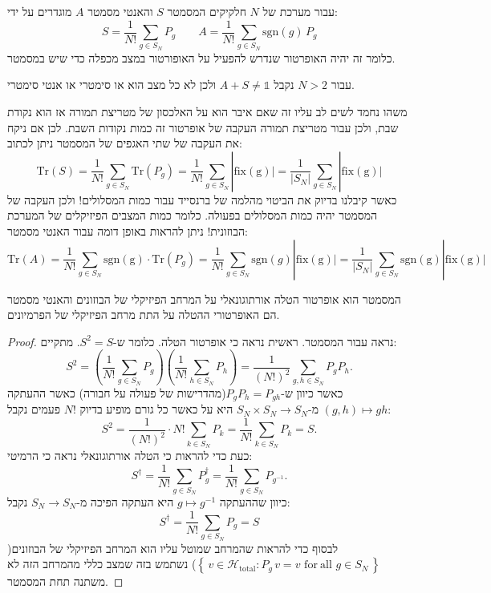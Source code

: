 \documentclass{tstextbook}
\begin{document}
\begin{definition}
עבור מערכת של \(N\) חלקיקים המסמטר \(S\) והאנטי מסמטר \(A\) מוגדרים על ידי:
$$S={\frac{1}{N!}}\sum_{g\in S_{N}}P_{g}\qquad A=\frac{1}{N!}\sum_{g\in S_{N}}\mathrm{sgn}(g)\,P_{g}$$
כלומר זה יהיה האופרטור שנדרש להפעיל על האופורטור במצב מכפלה כדי שיש במסמטר. 

\end{definition}
\begin{remark}
עבור \(N>2\) נקבל \(A+S\neq \mathbb{1}\) ולכן לא כל מצב הוא או סימטרי או אנטי סימטרי.

\end{remark}
\begin{remark}
משהו נחמד לשים לב עליו זה שאם איבר הוא על האלכסון של מטריצת תמורה אז הוא נקודת שבת, ולכן עבור מטריצת תמורה העקבה של אופרטור זה כמות נקודות השבת. לכן אם ניקח את העקבה של שתי האגפים של המסמטר ניתן לכתוב:
$$\mathrm{Tr}(S)=\frac{1}{N!}\sum_{g\in S_{N}}\mathrm{Tr}(P_{g})=\frac{1}{N!}\sum_{g \in S_{N}}|\mathrm{fix(g)|}=\frac{1}{|S_{N}|}\sum_{g \in S_{N}}|\mathrm{fix(g)|}$$
כאשר קיבלנו בדיוק את הביטוי מהלמה של ברנסייד עבור כמות המסלולים! ולכן העקבה של המסמטר יהיה כמות המסלולים בפעולה. כלומר כמות המצבים הפיזיקלים של המערכת הבוזונית! ניתן להראות באופן דומה עבור האנטי מסמטר:
$$\mathrm{Tr}(A)=\frac{1}{N!}\sum_{g\in S_{N}}\mathrm{sgn(g)}\cdot\mathrm{Tr}(P_{g})=\frac{1}{N!}\sum_{g \in S_{N}}\mathrm{sgn}(g)|\mathrm{fix(g)|}=\frac{1}{|S_{N}|}\sum_{g \in S_{N}}\mathrm{sgn(g)}|\mathrm{fix(g)|}$$

\end{remark}
\begin{proposition}
המסמטר הוא אופרטור הטלה אורתוגונאלי על המרחב הפיזיקלי של הבוזונים והאנטי מסמטר הם האופרטורי ההטלה על התת מרחב הפיזיקלי של הפרמיונים.

\end{proposition}
\begin{proof}
נראה עבור המסמטר. ראשית נראה כי אופרטור הטלה. כלומר ש-\(S^{2}=S\). מתקיים:
$$S^{2}=\left(\frac{1}{N!}\sum_{g\in S_{N}}P_{g}\right)\left(\frac{1}{N!}\sum_{h\in S_{N}}P_{h}\right)=\frac{1}{(N!)^{2}}\sum_{g,h\in S_{N}}P_{g}P_{h}.$$
כאשר כיוון ש-\(P_{g}P_{h}=P_{gh}\)(מהדרישות של פעולה על חבורה) כאשר ההעתקה \((g,h)\mapsto gh\) מ-\(S_{N}\times S_{N}\to S_{N}\) היא על כאשר כל גורם מופיע בדיוק \(N!\) פעמים נקבל:
$$S^{2}={\frac{1}{(N!)^{2}}}\cdot N!\sum_{k\in S_{N}}P_{k}={\frac{1}{N!}}\sum_{k\in S_{N}}P_{k}=S.$$
כעת כדי להראות כי הטלה אורתוגונאלי נראה כי הרמיטי:
$$S^{\dagger}=\frac{1}{N!}\sum_{g\in S_{N}}P_{g}^{\dagger}=\frac{1}{N!}\sum_{g\in S_{N}}P_{g^{-1}}.$$
כיוון שההעתקה \(g\mapsto g^{-1}\) היא העתקה הפיכה מ-\(S_N\to S_{N}\) נקבל:
$$S^{\dagger}=\frac{1}{N!}\sum_{g\in S_{N}}P_{g}=S$$
לבסוף כדי להראות שהמרחב שמוטל עליו הוא המרחב הפיזיקלי של הבוזונים(\(\left\{\,v\in{\mathcal{H}}_{\mathrm{total}}:P_{g}\,v=v\,\,\mathrm{for~all}\,\,g\in S_{N}\,\right\}\)) נשתמש בזה שמצב כללי מהמרחב הזה לא משתנה תחת המסמטר.

\end{proof}
\end{document}
